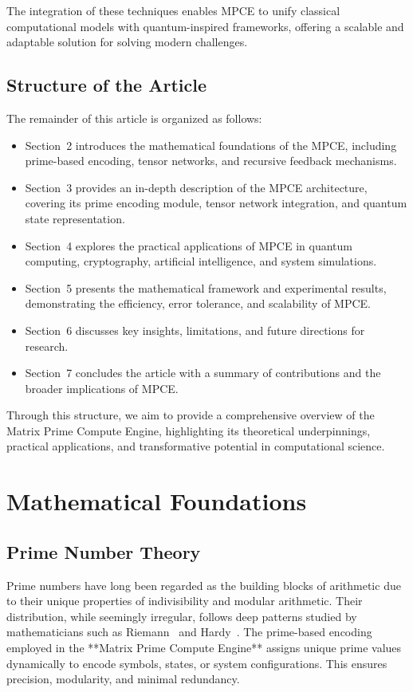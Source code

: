 \documentclass{article}
\theoremstyle{plain}
\begin{document}
The integration of these techniques enables MPCE to unify classical computational models with quantum-inspired frameworks, offering a scalable and adaptable solution for solving modern challenges.

\subsection{Structure of the Article}

The remainder of this article is organized as follows:

\begin{itemize}
    \item Section~2 introduces the mathematical foundations of the MPCE, including prime-based encoding, tensor networks, and recursive feedback mechanisms.
    \item Section~3 provides an in-depth description of the MPCE architecture, covering its prime encoding module, tensor network integration, and quantum state representation.
    \item Section~4 explores the practical applications of MPCE in quantum computing, cryptography, artificial intelligence, and system simulations.
    \item Section~5 presents the mathematical framework and experimental results, demonstrating the efficiency, error tolerance, and scalability of MPCE.
    \item Section~6 discusses key insights, limitations, and future directions for research.
    \item Section~7 concludes the article with a summary of contributions and the broader implications of MPCE.
\end{itemize}

\noindent Through this structure, we aim to provide a comprehensive overview of the Matrix Prime Compute Engine, highlighting its theoretical underpinnings, practical applications, and transformative potential in computational science.

\section{Mathematical Foundations}

\subsection{Prime Number Theory}

Prime numbers have long been regarded as the building blocks of arithmetic due to their unique properties of indivisibility and modular arithmetic. Their distribution, while seemingly irregular, follows deep patterns studied by mathematicians such as Riemann~\cite{riemann1859hypothesis} and Hardy~\cite{hardy2008introduction}. The prime-based encoding employed in the **Matrix Prime Compute Engine** assigns unique prime values dynamically to encode symbols, states, or system configurations. This ensures precision, modularity, and minimal redundancy.
\end{document}
